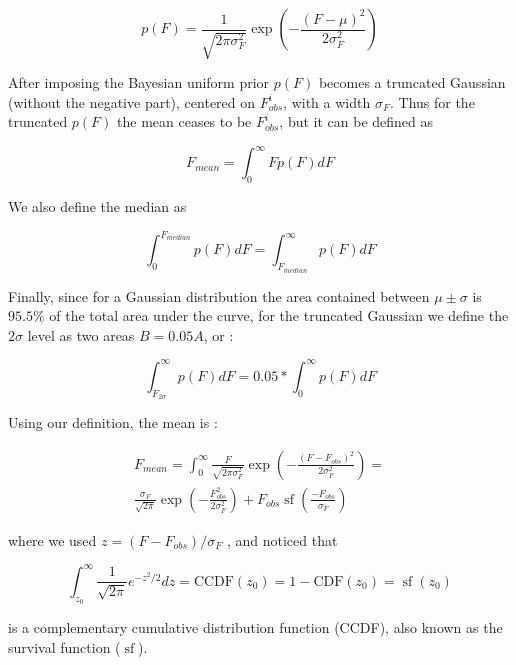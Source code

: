 \documentclass[fleqn,usenatbib]{mnras}  %
\DeclareMathOperator\sf{sf}
\begin{document}
\begin{equation}
p(F) = \frac{1}{\sqrt{2  \pi \sigma_{F}^{2}}} \exp{ \left(-\frac{(F-\mu)^{2}}{2\sigma_{F}^{2}}\right)}
\end{equation}

 After imposing the Bayesian uniform prior $p(F)$ becomes a truncated Gaussian (without the negative part), centered on $F_{obs}^{i}$, with a width $\sigma_F$. Thus for the truncated $p(F)$  the mean ceases to be $F_{obs}^{i}$, but it can be defined as 

\begin{equation}
F_{mean} = \int _{0} ^ {\infty} {F p(F) dF}
\end{equation} 

We also define the median as  

\begin{equation}
\int _{0} ^ {F_{median}} {p(F) dF} = \int _{F_{median}} ^ {\infty} {p(F) dF}
\end{equation} 

Finally, since for a Gaussian distribution the area contained between $\mu \pm \sigma$ is $95.5 \%$ of the total area under the curve, for the truncated Gaussian we define the  $2 \sigma$ level as  two areas  $B = 0.05 A$, or : 

\begin{equation}
\int _{F_{2 \sigma}} ^{\infty} {p(F)dF} = 0.05 * \int _{0} ^{\infty} {p(F) dF} 
\end{equation}

Using our definition, the mean is :  


\begin{multline}
F_{mean} = \int _{0} ^ {\infty} {\frac{F}{\sqrt{2\pi\sigma_{F}^{2}}} \exp{\left(-\frac{(F-F_{obs})^{2}}{2\sigma_{F}^{2}}\right)} } = \\  \frac{\sigma_{F}}{\sqrt{2 \pi}} \exp{\left(- \frac{F_{obs}^{2}}{2\sigma_{F}^{2}} \right)} + F_{obs} \sf{\left( \frac{-F_{obs}}{\sigma_{F}}\right)}
\end{multline}

where we used $z = (F-F_{obs}) /\sigma_F $ , and noticed that

\begin{equation}
\int_{z_{0}}^{\infty}{\frac{1}{\sqrt{2\pi}} e^{-z^2 / 2 } dz} = \text{CCDF}(z_{0}) = 1-\text{CDF}(z_{0}) = \sf{(z_{0})}
\end{equation}

is a complementary cumulative distribution function (CCDF), also known as the survival function ($\sf$). 
\end{document}
